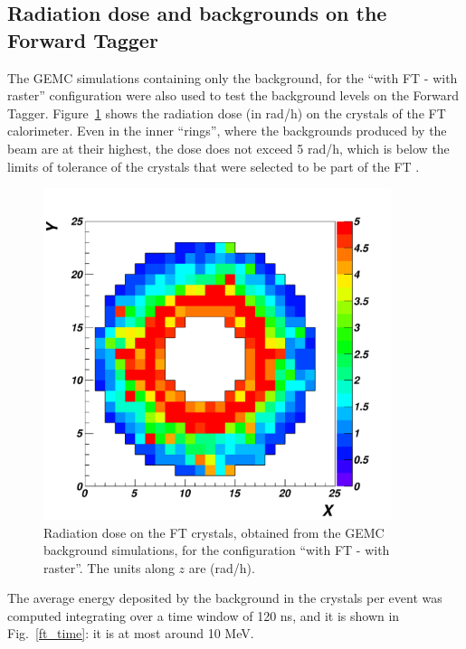 \subsection{Radiation dose and backgrounds on the Forward Tagger}
The GEMC simulations containing only the background, for the ``with FT - with raster'' configuration were also used to test the background levels on the Forward Tagger. Figure~\ref{FT_dose} shows the radiation dose (in rad/h) on the crystals of the FT calorimeter. Even in the inner ``rings'', where the backgrounds produced by the beam are at their highest, the dose does not exceed 5 rad/h, which is below the limits of tolerance of the crystals that were selected to be part of the FT \cite{fegan_FT}. 
\begin{figure}[htbp] 
   \centering
   \includegraphics[width=4in]{ft_rad.pdf} 
   \caption{Radiation dose on the FT crystals, obtained from the GEMC background simulations, for the configuration ``with FT - with raster''. The units along $z$ are (rad/h).}
   \label{FT_dose}
\end{figure}
The average energy deposited by the background in the crystals per event was computed integrating over a time window of 120 ns, and it is shown in Fig.~\ref{ft_time}: it is at most around 10 MeV. 

